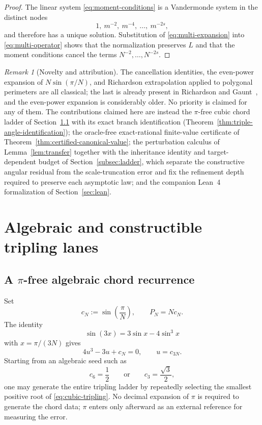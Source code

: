 \documentclass[12pt]{article}
\theoremstyle{definition}
\theoremstyle{remark}
\newtheorem{remark}[theorem]{Remark}
\begin{document}
\begin{proof}
The linear system \eqref{eq:moment-conditions} is a Vandermonde system in the
distinct nodes
\[
  1,\ m^{-2},\ m^{-4},\ \ldots,\ m^{-2s},
\]
and therefore has a unique solution.  Substitution of
\eqref{eq:multi-expansion} into \eqref{eq:multi-operator} shows that the
normalization preserves $L$ and that the moment conditions cancel the terms
$N^{-2},\ldots,N^{-2s}$.
\end{proof}

\begin{remark}[Novelty and attribution]
\label{rem:novelty}
The cancellation identities, the even-power expansion of $N\sin(\pi/N)$, and
Richardson extrapolation applied to polygonal perimeters are all classical; the
last is already present in Richardson and Gaunt~\cite{richardson-gaunt}, and the
even-power expansion is considerably older.  No priority is claimed for any of
them.  The contributions claimed here are instead the $\pi$-free cubic chord
ladder of Section~\ref{subsec:chord-recurrence} with its exact branch
identification (Theorem~\ref{thm:triple-angle-identification}); the oracle-free
exact-rational finite-value certificate of
Theorem~\ref{thm:certified-canonical-value}; the perturbation calculus of
Lemma~\ref{lem:transfer} together with the inheritance identity and
target-dependent budget of Section~\ref{subsec:ladder}, which separate the
constructive angular residual from the scale-truncation error and fix the
refinement depth required to preserve each asymptotic law; and the companion
Lean~4 formalization of Section~\ref{sec:lean}.
\end{remark}

\section{Algebraic and constructible tripling lanes}

\subsection{A $\pi$-free algebraic chord recurrence}
\label{subsec:chord-recurrence}

Set
\begin{equation}
  c_N:=\sin\!\left(\frac{\pi}{N}\right),
  \qquad P_N=Nc_N.
  \label{eq:chord-half-length}
\end{equation}
The identity
\[
  \sin(3x)=3\sin x-4\sin^3x
\]
with $x=\pi/(3N)$ gives
\begin{equation}
  4u^3-3u+c_N=0,
  \qquad u=c_{3N}.
  \label{eq:cubic-tripling}
\end{equation}
Starting from an algebraic seed such as
\[
  c_6=\frac12
  \qquad\text{or}\qquad
  c_3=\frac{\sqrt3}{2},
\]
one may generate the entire tripling ladder by repeatedly selecting the
smallest positive root of \eqref{eq:cubic-tripling}.  No decimal expansion of $\pi$ is
required to generate the chord data; $\pi$ enters only afterward as an
external reference for measuring the error.
\end{document}
